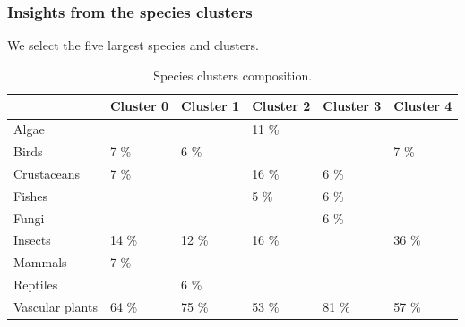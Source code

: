 \documentclass[
	11pt, %
]{beamer}
\begin{document}
\begin{frame}
\frametitle{Insights from the species clusters}
We select the five largest species and clusters.
\begin{table}[H]
\smaller
\centering
\begin{tabular}{|l|l|l|l|l|l|}
\hline
             & Cluster 0 & Cluster 1         & Cluster 2  & Cluster 3           & Cluster 4 \\ \hline
Algae           &           &            & 11 \%      &            &            \\ \hline
Birds           & 7 \%      & 6 \%       &            &            & 7 \%       \\ \hline
Crustaceans     & 7 \%      &            & 16 \%      & 6 \%       &            \\ \hline
Fishes          &           &            & 5 \%       & 6 \%       &            \\ \hline
Fungi           &           &            &            & 6 \%       &            \\ \hline
Insects         & 14 \%     & 12 \%      & 16 \%      &            & 36 \%      \\ \hline
Mammals         & 7 \%      &            &            &            &            \\ \hline
Reptiles        &           & 6 \%       &            &            &            \\ \hline
Vascular plants & 64 \%     & 75 \%      & 53 \%      & 81 \%      & 57 \%      \\ \hline
\end{tabular}
\caption{Species clusters composition.}
\label{table:clusters_species}
\end{table}

\end{frame}
\end{document}
